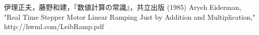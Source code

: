 \documentclass[twocolumn,oneside,a4paper]{article}
\begin{document}



\begin{thebibliography}{99}
   伊理正夫，藤野和建，『数値計算の常識』，共立出版 (1985)
   Aryeh Eiderman, "Real Time Stepper Motor Linear Ramping Just by Addition and Multiplication," http://hwml.com/LeibRamp.pdf
\end{thebibliography}
\end{document}
